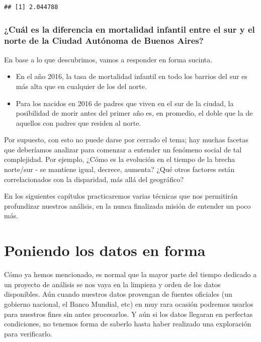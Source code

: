 \documentclass[]{book}
\begin{document}
\begin{verbatim}
## [1] 2.044788
\end{verbatim}

\subsection{¿Cuál es la diferencia en mortalidad infantil entre el sur y
el norte de la Ciudad Autónoma de Buenos
Aires?}\label{cual-es-la-diferencia-en-mortalidad-infantil-entre-el-sur-y-el-norte-de-la-ciudad-autonoma-de-buenos-aires}

En base a lo que descubrimos, vamos a responder en forma sucinta.

\begin{itemize}
\item
  En el año 2016, la tasa de mortalidad infantil en todo los barrios del
  sur es más alta que en cualquier de los del norte.
\item
  Para los nacidos en 2016 de padres que viven en el sur de la ciudad,
  la posibilidad de morir antes del primer año es, en promedio, el doble
  que la de aquellos con padres que residen al norte.
\end{itemize}

Por supuesto, con esto no puede darse por cerrado el tema; hay muchas
facetas que deberíamos analizar para comenzar a entender un fenómeno
social de tal complejidad. Por ejemplo, ¿Cómo es la evolución en el
tiempo de la brecha norte/sur - se mantiene igual, decrece, aumenta?
¿Qué otros factores están correlacionados con la disparidad, más allá
del geográfico?

En los siguientes capítulos practicaremos varias técnicas que nos
permitirán profundizar nuestros análisis, en la nunca finalizada misión
de entender un poco más.

\chapter{Poniendo los datos en forma}\label{poniendo-los-datos-en-forma}

Cómo ya hemos mencionado, es normal que la mayor parte del tiempo
dedicado a un proyecto de análisis se nos vaya en la limpieza y orden de
los datos disponibles. Aún cuando nuestros datos provengan de fuentes
oficiales (un gobierno nacional, el Banco Mundial, etc) en muy rara
ocasión podremos usarlos para nuestros fines sin antes procesarlos. Y
aún si los datos llegaran en perfectas condiciones, no tenemos forma de
saberlo hasta haber realizado una exploración para verificarlo.
\end{document}
